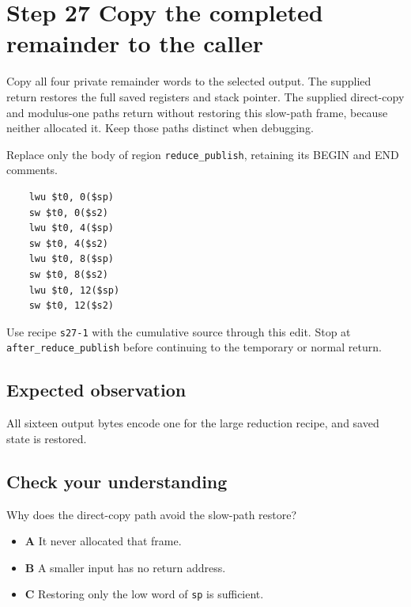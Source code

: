 \section{Step 27 Copy the completed remainder to the caller}\label{rsa-s27}

Copy all four private remainder words to the selected output. The supplied return restores the full saved registers and stack pointer. The supplied direct-copy and modulus-one paths return without restoring this slow-path frame, because neither allocated it. Keep those paths distinct when debugging.

Replace only the body of region \texttt{reduce\_publish}, retaining its BEGIN and END comments.

\begin{verbatim}
    lwu $t0, 0($sp)
    sw $t0, 0($s2)
    lwu $t0, 4($sp)
    sw $t0, 4($s2)
    lwu $t0, 8($sp)
    sw $t0, 8($s2)
    lwu $t0, 12($sp)
    sw $t0, 12($s2)
\end{verbatim}

Use recipe \texttt{s27-1} with the cumulative source through this edit. Stop at \texttt{after\_reduce\_publish} before continuing to the temporary or normal return.

\subsection{Expected observation}
All sixteen output bytes encode one for the large reduction recipe, and saved state is restored.

\subsection{Check your understanding}
Why does the direct-copy path avoid the slow-path restore?

\begin{itemize}
\item \textbf{A} It never allocated that frame.
\item \textbf{B} A smaller input has no return address.
\item \textbf{C} Restoring only the low word of \texttt{sp} is sufficient.
\end{itemize}
